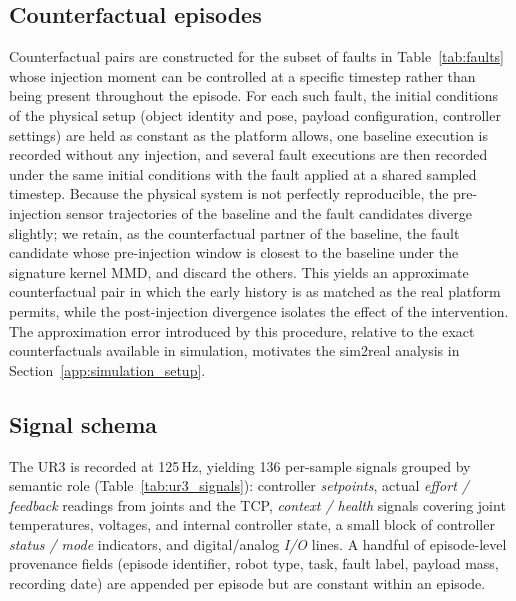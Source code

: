 \documentclass{article}
\begin{document}
\subsection{Counterfactual episodes}

Counterfactual pairs are constructed for the subset of faults in Table~\ref{tab:faults} whose injection moment can be controlled at a specific timestep rather than being present throughout the episode. For each such fault, the initial conditions of the physical setup (object identity and pose, payload configuration, controller settings) are held as constant as the platform allows, one baseline execution is recorded without any injection, and several fault executions are then recorded under the same initial conditions with the fault applied at a shared sampled timestep. Because the physical system is not perfectly reproducible, the pre-injection sensor trajectories of the baseline and the fault candidates diverge slightly; we retain, as the counterfactual partner of the baseline, the fault candidate whose pre-injection window is closest to the baseline under the signature kernel MMD, and discard the others. This yields an approximate counterfactual pair in which the early history is as matched as the real platform permits, while the post-injection divergence isolates the effect of the intervention. The approximation error introduced by this procedure, relative to the exact counterfactuals available in simulation, motivates the sim2real analysis in Section~\ref{app:simulation_setup}.


\subsection{Signal schema}

The UR3 is recorded at 125\,Hz, yielding 136 per-sample signals grouped by semantic role (Table~\ref{tab:ur3_signals}): controller \emph{setpoints}, actual \emph{effort / feedback} readings from joints and the TCP, \emph{context / health} signals covering joint temperatures, voltages, and internal controller state, a small block of controller \emph{status / mode} indicators, and digital/analog \emph{I/O} lines. A handful of episode-level provenance fields (episode identifier, robot type, task, fault label, payload mass, recording date) are appended per episode but are constant within an episode.
\end{document}
